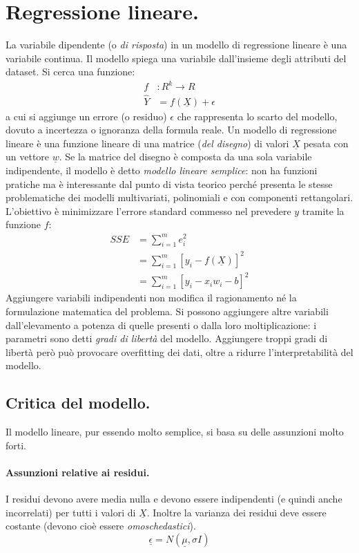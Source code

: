 \documentclass[11pt, a4page, twocolumn]{article}
\begin{document}
\section{Regressione lineare.}
La variabile dipendente (o \textit{di risposta}) in un modello di regressione lineare è una variabile continua.
Il modello spiega una variabile dall'insieme degli attributi del dataset.
Si cerca una funzione: 
\begin{align*}
  f &: R^k \rightarrow R \\
  \widehat{Y} &= f(\underline{X}) + \epsilon
\end{align*}
a cui si aggiunge un errore (o residuo) $\epsilon$ che rappresenta lo scarto del modello, dovuto a incertezza o ignoranza della formula reale. \newline
Un modello di regressione lineare è una funzione lineare di una matrice (\textit{del disegno}) di valori $\underline{X}$ pesata con un vettore $\underline{w}$.
Se la matrice del disegno è composta da una sola variabile indipendente, il modello è detto \textit{modello lineare semplice}: non ha funzioni pratiche ma è interessante dal punto di vista teorico perché presenta le stesse problematiche dei modelli multivariati, polinomiali e con componenti rettangolari. \newline
L'obiettivo è minimizzare l'errore standard commesso nel prevedere $y$ tramite la funzione $f$:
\begin{align*}
  SSE &= \sum^m_{i=1}{e^2_i} \\
      &= \sum^m_{i=1}{[y_i - f(\underline{X})]^2} \\
      &= \sum^m_{i=1}{[y_i - x_i w_i - b]^2}
\end{align*}
Aggiungere variabili indipendenti non modifica il ragionamento né la formulazione matematica del problema.
Si possono aggiungere altre variabili dall'elevamento a potenza di quelle presenti o dalla loro moltiplicazione: i parametri sono detti \textit{gradi di libertà} del modello.
Aggiungere troppi gradi di libertà però può provocare overfitting dei dati, oltre a ridurre l'interpretabilità del modello.

\subsection{Critica del modello.}
Il modello lineare, pur essendo molto semplice, si basa su delle assunzioni molto forti.

\paragraph{Assunzioni relative ai residui.}
I residui devono avere media nulla e devono essere indipendenti (e quindi anche incorrelati) per tutti i valori di $\underline{X}$.
Inoltre la varianza dei residui deve essere costante (devono cioè essere \textit{omoschedastici}).
\begin{equation*}
  \underline{\epsilon} = N(\underline{\mu}, \sigma{}I)
\end{equation*}
\end{document}
